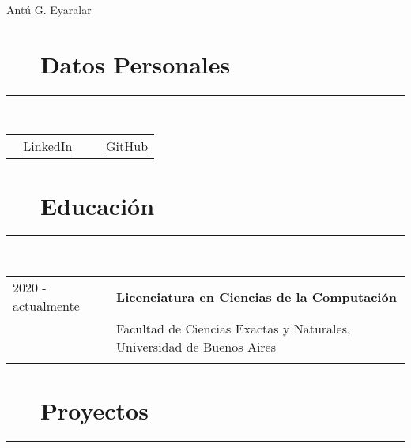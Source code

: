 \documentclass{article}
\begin{document}
\pagestyle{empty}

\par{\centering
		{\huge Antú G. Eyaralar}
	\bigskip\par}

\section*{\faAt ~~ Datos Personales} 
\hrule

\
\newline
\

\begin{tabular}{l | l}
      \faLinkedin ~ \href{https://www.linkedin.com/in/antú-eyaralar-409297221/}{LinkedIn} \
     & \faGithub ~ \href{https://github.com/Agelar01}{GitHub} 
\end{tabular}

\section*{\faBook ~~ Educación} 
\hrule

\
\newline
\

\begin{tabular}{l l}
    2020 - actualmente  & \textbf{Licenciatura en Ciencias de la Computación}\\
                    & Facultad de Ciencias Exactas y Naturales, Universidad de Buenos Aires \\ \\
\end{tabular}

\section*{\faFileCodeO ~~ Proyectos}
\hrule
\
\end{document}
